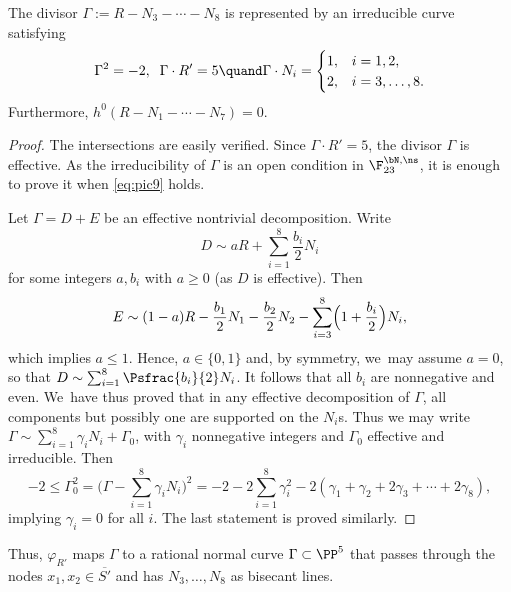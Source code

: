 \begin{lemma} \label{lemma:Juve-15}
The divisor $
\Gamma:=R-N_3-\cdots-N_8
$
is represented by an irreducible curve satisfying
\[
 \Gamma^2=-2, \;\; \Gamma\cdot R'=5 \quand\Gamma \cdot N_i =
\begin{cases}
1, & i=1,2, \\
2, & i=3,\ldots,8.
\end{cases}
\]
Furthermore, $h^0(R-N_1-\cdots-N_7)=0$.
\end{lemma}

\begin{proof}
The intersections are easily verified. Since $\Gamma \cdot R'=5$, the divisor $\Gamma$ is effective.
As the irreducibility of $\Gamma$ is an open condition in $\F_{23}^{\bN,\ns}$, it is enough to prove it when \eqref{eq:pic9} holds.

Let $\Gamma=D+E$ be an effective nontrivial decomposition. Write
\[
D \sim aR+\sum_{i=1}^8 \frac{b_i}{2}N_i
\]
for some integers $a,b_i$ with $a \geq 0$ (as $D$ is effective). Then
\[
E \sim (1-a)R-\frac{b_1}{2}N_1-\frac{b_2}{2}N_2 -\sum_{i=3}^8 \Bigl(1+\frac{b_i}{2}\Bigr)N_i,
\]
which implies $a \leq 1$. Hence, $a \in \{0,1\}$ and, by symmetry, we~may assume $a=0$, so that $D \sim \sum_{i=1}^8 \Psfrac{b_i}{2}N_i$. It follows that all $b_i$ are nonnegative and even. We~have thus proved that in any effective decomposition of $\Gamma$, all components but possibly one are supported on the $N_i$s. Thus we may write $\Gamma \sim \sum_{i=1}^8 \gamma_iN_i+\Gamma_0$, with $\gamma_i$ nonnegative integers and $\Gamma_0$ effective and irreducible. Then
\[
 -2 \leq \Gamma_0^2=\biggl(\Gamma -\sum_{i=1}^8 \gamma_iN_i\biggr)^2=
-2-2\sum_{i=1}^8 \gamma_i^2-2(\gamma_1+\gamma_2+2\gamma_3+\cdots+2\gamma_8),
\]
implying $\gamma_i=0$ for all $i$. The last statement is proved similarly.
\end{proof}

Thus, $\varphi_{R'}$ maps $\Gamma$ to a rational normal curve $\Gamma\subset \PP^5$ that passes through the nodes $x_1,x_2\in \overline{S'}$ and has $N_3,\ldots,N_8$ as bisecant lines.

\Changel

